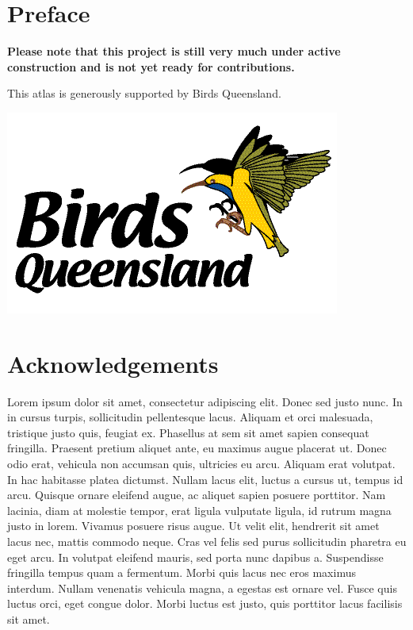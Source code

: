 \documentclass[12pt,openany,oneside]{book}
\renewcommand{\tableofcontents}{}
\newcommand{\adjustimg}{%
  \checkoddpage%
  \ifoddpage\hspace*{\dimexpr\evensidemargin-\oddsidemargin}\else\hspace*{-\dimexpr\evensidemargin-\oddsidemargin}\fi%
}
\newcommand{\centerimg}[2][width=\textwidth]{%
  \makebox[\textwidth]{\adjustimg\texttt{[image: \#2]}}%
}
\theoremstyle{definition}
\theoremstyle{definition}
\theoremstyle{definition}
\theoremstyle{remark}
\begin{document}
\begin{titlepage}
\mbox{} \par
\noindent\centerimg[width=\paperwidth,height=\paperheight]{assets/misc/book-cover.png}
\end{titlepage}

% 

{
\setcounter{tocdepth}{0}
\tableofcontents
}
\setcounter{page}{1}

\hypertarget{preface}{%
\chapter{Preface}\label{preface}}

\textbf{Please note that this project is still very much under active
construction and is not yet ready for contributions.}

This atlas is generously supported by Birds Queensland.

\includegraphics{assets/misc/bq-logo.png}

\hypertarget{acknowledgements}{%
\chapter{Acknowledgements}\label{acknowledgements}}

Lorem ipsum dolor sit amet, consectetur adipiscing elit. Donec sed justo
nunc. In in cursus turpis, sollicitudin pellentesque lacus. Aliquam et
orci malesuada, tristique justo quis, feugiat ex. Phasellus at sem sit
amet sapien consequat fringilla. Praesent pretium aliquet ante, eu
maximus augue placerat ut. Donec odio erat, vehicula non accumsan quis,
ultricies eu arcu. Aliquam erat volutpat. In hac habitasse platea
dictumst. Nullam lacus elit, luctus a cursus ut, tempus id arcu. Quisque
ornare eleifend augue, ac aliquet sapien posuere porttitor. Nam lacinia,
diam at molestie tempor, erat ligula vulputate ligula, id rutrum magna
justo in lorem. Vivamus posuere risus augue. Ut velit elit, hendrerit
sit amet lacus nec, mattis commodo neque. Cras vel felis sed purus
sollicitudin pharetra eu eget arcu. In volutpat eleifend mauris, sed
porta nunc dapibus a. Suspendisse fringilla tempus quam a fermentum.
Morbi quis lacus nec eros maximus interdum. Nullam venenatis vehicula
magna, a egestas est ornare vel. Fusce quis luctus orci, eget congue
dolor. Morbi luctus est justo, quis porttitor lacus facilisis sit amet.
\end{document}
